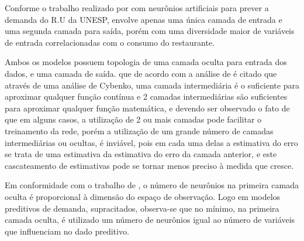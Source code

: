            Conforme  o trabalho realizado por  com neurônios artificiais para prever a demanda do R.U da UNESP, envolve apenas uma única camada de entrada e uma segunda camada para saída, porém com uma diversidade maior de variáveis de entrada correlacionadas com o consumo do restaurante. 
           \begin{figure}[H]
           \end{figure}
         
            Ambos os modelos possuem topologia de uma camada oculta para entrada dos dados, e uma camada de saída. que de acordo com  a análise de   é citado que através de uma análise de Cybenko, uma camada intermediária é o suficiente para aproximar qualquer função contínua e 2 camadas intermediárias são suficientes para aproximar qualquer função matemática, e devendo ser observado o fato de que em alguns casos, a utilização de 2 ou mais camadas pode facilitar o treinamento da rede, porém a utilização de um grande número de camadas intermediárias ou ocultas, é inviável, pois em cada uma delas a estimativa do erro se trata de uma estimativa da estimativa do erro da camada anterior, e este cascateamento de estimativas pode se tornar menos preciso à medida que cresce.
            
          Em conformidade com o trabalho de  , o número de neurônios na primeira camada oculta é proporcional à dimensão do espaço de observação. Logo em modelos preditivos de demanda, supracitados, observa-se que no mínimo, na primeira camada oculta, é utilizado um número de neurônios igual ao número de variáveis que influenciam no dado preditivo.
            
